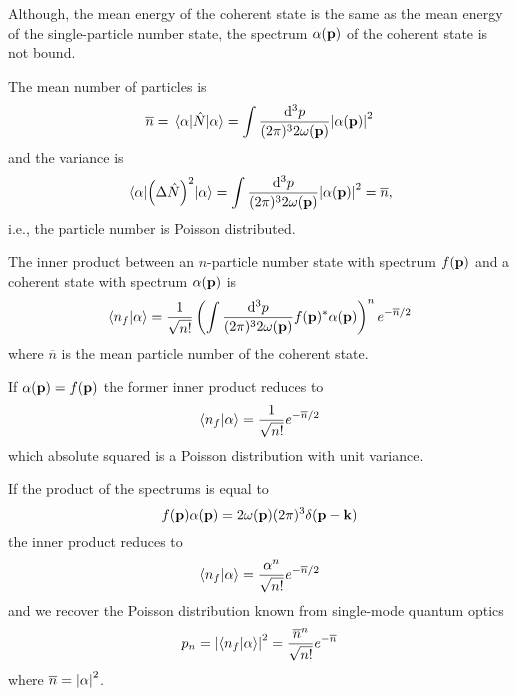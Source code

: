 Although, the mean energy of the coherent state is the same as the mean energy of the single-particle number state, the spectrum $\alpha(\vb{p})$ of the coherent state is not bound.
\begin{lemma}\label{thm:coherent_state_number_observable}
	The mean number of particles is
	\begin{equation}
		\overline{n}
		=
		\expval{\hat{N}}{\alpha}
		=
		\int\frac{\dd[3]{p}}{(2\pi)^32\omega(\vb{p})}
		\abs{\alpha(\vb{p})}^2
	\end{equation}
	and the variance is
	\begin{equation}
		\expval{\left(\Delta\hat{N}\right)^2}{\alpha}
		=
		\int\frac{\dd[3]{p}}{(2\pi)^32\omega(\vb{p})}
		\abs{\alpha(\vb{p})}^2
		=
		\overline{n}
		,
	\end{equation}
	i.e., the particle number is Poisson distributed.
\end{lemma}
\begin{lemma}\label{thm:coherent_state_number_state_inner_product}
	The inner product between an $n$-particle number state with spectrum $f(\vb{p})$ and a coherent state with spectrum $\alpha(\vb{p})$ is
	\begin{equation}
		\braket{n_f}{\alpha}
		=
		\frac{1}{\sqrt{n!}}
		\left(
			\int\frac{\dd[3]{p}}{(2\pi)^32\omega(\vb{p})}
			f(\vb{p})^*
			\alpha(\vb{p})
		\right)^n
		e^{-\overline{n}/2}
	\end{equation}
	where $\overline{n}$ is the mean particle number of the coherent state.
\end{lemma}
\begin{corollary}
	If $\alpha(\vb{p})=f(\vb{p})$ the former inner product reduces to
	\begin{equation}
		\braket{n_f}{\alpha}
		=
		\frac{1}{\sqrt{n!}}
		e^{-\overline{n}/2}
	\end{equation}
	which absolute squared is a Poisson distribution with unit variance.
\end{corollary}
\begin{corollary}
	If the product of the spectrums is equal to
	\begin{equation}
		f(\vb{p})
		\alpha(\vb{p})
		=
		2\omega(\vb{p})
		(2\pi)^3
		\delta(\vb{p}-\vb{k})
	\end{equation}
	the inner product reduces to
	\begin{equation}
		\braket{n_f}{\alpha}
		=
		\frac{\alpha^n}{\sqrt{n!}}
		e^{-\overline{n}/2}
	\end{equation}
	and we recover the Poisson distribution known from single-mode quantum optics
	\begin{equation}
		p_n
		=
		\abs{\braket{n_f}{\alpha}}^2
		=
		\frac{\overline{n}^n}{\sqrt{n!}}
		e^{-\overline{n}}
	\end{equation}
	where $\overline{n}=\abs{\alpha}^2$.
\end{corollary}